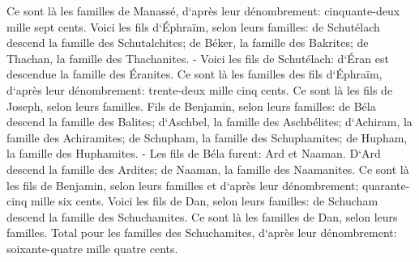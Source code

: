 \verse Ce sont là les familles de Manassé, d`après leur dénombrement: cinquante-deux mille sept cents. 
\verse Voici les fils d`Éphraïm, selon leurs familles: de Schutélach descend la famille des Schutalchites; de Béker, la famille des Bakrites; de Thachan, la famille des Thachanites. - 
\verse Voici les fils de Schutélach: d`Éran est descendue la famille des Éranites. 
\verse Ce sont là les familles des fils d`Éphraïm, d`après leur dénombrement: trente-deux mille cinq cents. Ce sont là les fils de Joseph, selon leurs familles. 
\verse Fils de Benjamin, selon leurs familles: de Béla descend la famille des Balites; d`Aschbel, la famille des Aschbélites; d`Achiram, la famille des Achiramites; 
\verse de Schupham, la famille des Schuphamites; de Hupham, la famille des Huphamites. - 
\verse Les fils de Béla furent: Ard et Naaman. D`Ard descend la famille des Ardites; de Naaman, la famille des Naamanites. 
\verse Ce sont là les fils de Benjamin, selon leurs familles et d`après leur dénombrement; quarante-cinq mille six cents. 
\verse Voici les fils de Dan, selon leurs familles: de Schucham descend la famille des Schuchamites. Ce sont là les familles de Dan, selon leurs familles. 
\verse Total pour les familles des Schuchamites, d`après leur dénombrement: soixante-quatre mille quatre cents. 
